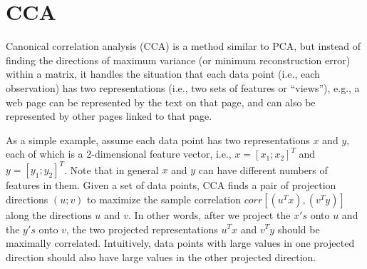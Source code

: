 \section{CCA}

Canonical correlation analysis (CCA) is a method similar to PCA, but
instead of finding the directions of maximum variance (or minimum reconstruction error) within a matrix,
it handles the situation that each data point (i.e., each observation) has two
representations (i.e., two sets of features or ``views''), e.g., a web page can be
represented by the text on that page, and can also be represented by
other pages linked to that page. 

As a simple example, assume each data point has two
representations $x$ and $y$, each of which is a 2-dimensional feature
vector, i.e., $x = [x_1; x_2]^T$ and $y = [y_1; y_2]^T$. Note that in general $x$ and $y$ can have different
numbers of features in them. Given a set of data
points, CCA finds a pair of projection directions $(u; v)$ to maximize the
sample correlation $corr[(u^T x),(v^T y)]$ along the directions $u$ and $v$. In
other words, after we project the $x's$ onto $u$
and the $y's$ onto  $v$, the two projected
representations $u^T x$ and $v^T y$ should be maximally correlated.
Intuitively, data points with large values in one projected direction
should also have large values in the other projected direction.

